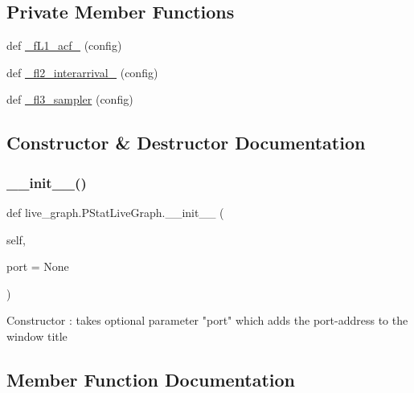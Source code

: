 \subsection*{Private Member Functions}
\begin{DoxyCompactItemize}
\item 
def \hyperlink{classlive__graph_1_1PStatLiveGraph_a4069f240b66cc2e37612e7d46786112d}{\+\_\+f\+L1\+\_\+acf\+\_\+} (config)
\item 
def \hyperlink{classlive__graph_1_1PStatLiveGraph_af25888b90f22f5ab1d0ab266277302d3}{\+\_\+fl2\+\_\+interarrival\+\_\+} (config)
\item 
def \hyperlink{classlive__graph_1_1PStatLiveGraph_a14250ec993ac4478944f53caaf6746ab}{\+\_\+fl3\+\_\+sampler} (config)
\end{DoxyCompactItemize}


\subsection{Constructor \& Destructor Documentation}
\mbox{\label{classlive__graph_1_1PStatLiveGraph_a210a499fd4e06392f8f5fffc209971a4}} 
\subsubsection{\texorpdfstring{\+\_\+\+\_\+init\+\_\+\+\_\+()}{\_\_init\_\_()}}
{\footnotesize\ttfamily def live\+\_\+graph.\+P\+Stat\+Live\+Graph.\+\_\+\+\_\+init\+\_\+\+\_\+ (\begin{DoxyParamCaption}\item[{}]{self,  }\item[{}]{port = {\ttfamily None} }\end{DoxyParamCaption})}

\begin{DoxyVerb}Constructor : takes optional parameter "port" which adds the port-address to the window title
\end{DoxyVerb}
 

\subsection{Member Function Documentation}
\mbox{\label{classlive__graph_1_1PStatLiveGraph_a4069f240b66cc2e37612e7d46786112d}} 
